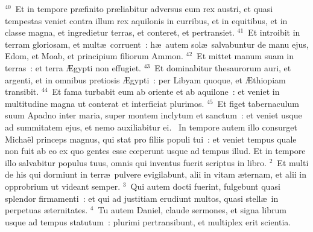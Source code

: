 ${}^{40}$~Et in tempore pr\ae finito pr\ae liabitur adversus eum rex austri, et quasi tempestas veniet contra illum rex aquilonis in curribus, et in equitibus, et in classe magna, et ingredietur terras, et conteret, et pertransiet.
${}^{41}$~Et introibit in terram gloriosam, et mult\ae\ corruent~: h\ae\ autem sol\ae\ salvabuntur de manu ejus, Edom, et Moab, et principium filiorum Ammon.
${}^{42}$~Et mittet manum suam in terras~: et terra \AE gypti non effugiet.
${}^{43}$~Et dominabitur thesaurorum auri, et argenti, et in omnibus pretiosis \AE gypti~: per Libyam quoque, et \AE thiopiam transibit.
${}^{44}$~Et fama turbabit eum ab oriente et ab aquilone~: et veniet in multitudine magna ut conterat et interficiat plurimos.
${}^{45}$~Et figet tabernaculum suum Apadno inter maria, super montem inclytum et sanctum~: et veniet usque ad summitatem ejus, et nemo auxiliabitur ei.
~In tempore autem illo consurget Micha\"el princeps magnus, qui stat pro filiis populi tui~: et veniet tempus quale non fuit ab eo ex quo gentes esse cœperunt usque ad tempus illud. Et in tempore illo salvabitur populus tuus, omnis qui inventus fuerit scriptus in libro.
${}^{2}$~Et multi de his qui dormiunt in terr\ae\ pulvere evigilabunt, alii in vitam \ae ternam, et alii in opprobrium ut videant semper.
${}^{3}$~Qui autem docti fuerint, fulgebunt quasi splendor firmamenti~: et qui ad justitiam erudiunt multos, quasi stell\ae\ in perpetuas \ae ternitates.
${}^{4}$~Tu autem Daniel, claude sermones, et signa librum usque ad tempus statutum~: plurimi pertransibunt, et multiplex erit scientia.


